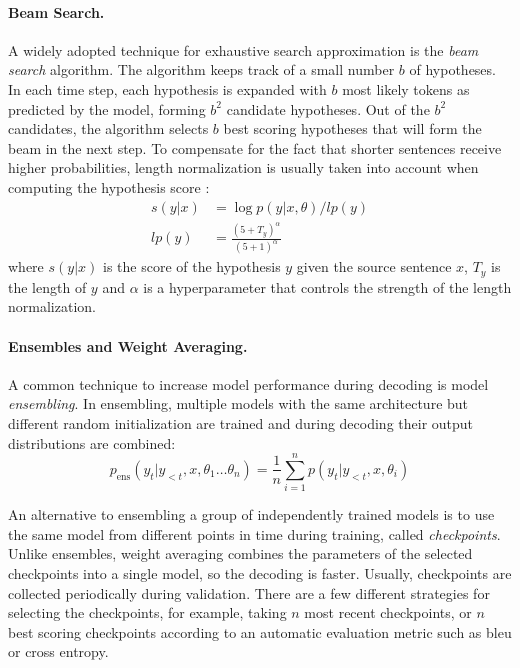 \paragraph{Beam Search.}
A widely adopted technique for exhaustive search approximation is the
\emph{beam search} algorithm. The algorithm keeps track of a small number $b$
of hypotheses. In each time step, each hypothesis is expanded with $b$ most
likely tokens as predicted by the model, forming $b^2$ candidate
hypotheses. Out of the $b^2$ candidates, the algorithm selects $b$ best scoring
hypotheses that will form the beam in the next step.  To compensate for the
fact that shorter sentences receive higher probabilities, length normalization
is usually taken into account when computing the hypothesis score
\citep{wu2016google}:%
%
\begin{equation}
  \begin{split}
  s(y|x) &= \log p(y|x, \theta) / lp(y) \\
  lp(y) &= \frac{(5 + T_y)^\alpha}{(5 + 1)^\alpha}
  \end{split}
\end{equation}
%
where $s(y|x)$ is the score of the hypothesis $y$ given the source sentence
$x$, $T_y$ is the length of $y$ and $\alpha$ is a hyperparameter that controls
the strength of the length normalization.

\paragraph{Ensembles and Weight Averaging.} A common technique to increase
model performance during decoding is model \emph{ensembling}. In ensembling,
multiple models with the same architecture but different random initialization
are trained and during decoding their output distributions are combined:
%
\begin{equation}
  p_{\text{ens}}(y_t | y_{<t}, x, \theta_1 \ldots \theta_n) =
  \frac{1}{n} \sum_{i=1}^n p(y_t | y_{<t}, x, \theta_i)
\end{equation}

An alternative to ensembling a group of independently trained models is to use
the same model from different points in time during training, called
\emph{checkpoints}. Unlike ensembles, weight averaging combines the parameters
of the selected checkpoints into a single model, so the decoding is faster.
Usually, checkpoints are collected periodically during validation. There are a
few different strategies for selecting the checkpoints, for example, taking $n$
most recent checkpoints, or $n$ best scoring checkpoints according to an
automatic evaluation metric such as \acs{bleu} or cross entropy.

